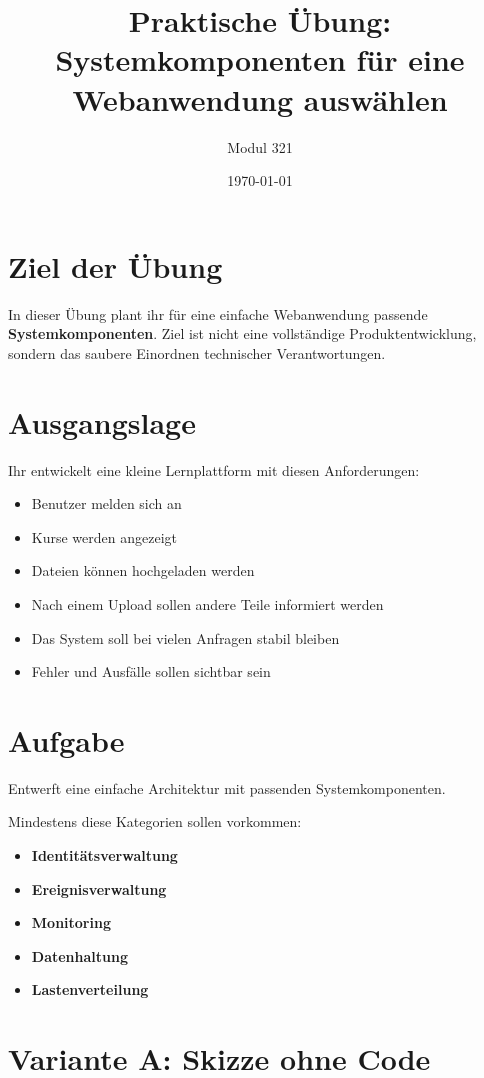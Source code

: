\documentclass[a4paper,12pt]{article}
\title{Praktische Übung: Systemkomponenten für eine Webanwendung auswählen}
\author{Modul 321}
\date{\today}
\begin{document}
\maketitle

\section*{Ziel der Übung}

In dieser Übung plant ihr für eine einfache Webanwendung passende
\textbf{Systemkomponenten}. Ziel ist nicht eine vollständige Produktentwicklung,
sondern das saubere Einordnen technischer Verantwortungen.

\section*{Ausgangslage}

Ihr entwickelt eine kleine Lernplattform mit diesen Anforderungen:

\begin{itemize}
\item Benutzer melden sich an
\item Kurse werden angezeigt
\item Dateien können hochgeladen werden
\item Nach einem Upload sollen andere Teile informiert werden
\item Das System soll bei vielen Anfragen stabil bleiben
\item Fehler und Ausfälle sollen sichtbar sein
\end{itemize}

\section*{Aufgabe}

Entwerft eine einfache Architektur mit passenden Systemkomponenten.

Mindestens diese Kategorien sollen vorkommen:

\begin{itemize}
\item \textbf{Identitätsverwaltung}
\item \textbf{Ereignisverwaltung}
\item \textbf{Monitoring}
\item \textbf{Datenhaltung}
\item \textbf{Lastenverteilung}
\end{itemize}

\section*{Variante A: Skizze ohne Code}
\end{document}
